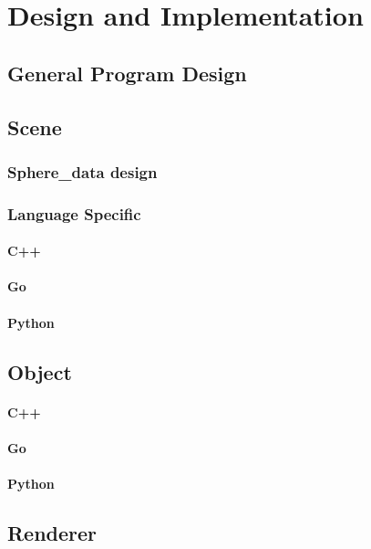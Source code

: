 \chapter{Design and Implementation}\label{chap:design}


\section{General Program Design}


\section{Scene}
\subsection{Sphere\_data design}
\subsection{Language Specific}
\subsubsection{C++}
\subsubsection{Go}
\subsubsection{Python}

\section{Object}
\subsubsection{C++}
\subsubsection{Go}
\subsubsection{Python}

\section{Renderer}

